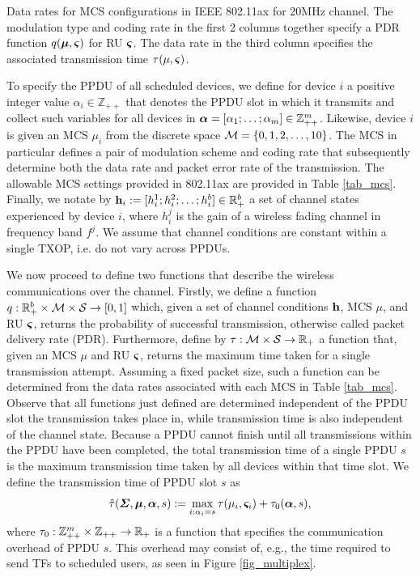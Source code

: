 \begin{table}

\caption{Data rates for MCS configurations in IEEE 802.11ax for 20MHz channel. The modulation type and coding rate in the first 2 columns together specify a PDR function $q(\boldsymbol{\mu},\boldsymbol{\varsigma})$ for RU $\boldsymbol{\varsigma}$. The data rate in the third column specifies the associated transmission time $\tau(\mu, \boldsymbol{\varsigma})$. }
\label{tab_mcs}
\end{table}

To specify the PPDU of all scheduled devices, we define for device $i$ a positive integer value $\alpha_i \in \mathbb{Z}_{++}$ that denotes the PPDU slot in which it transmits and collect such variables for all devices in $\boldsymbol{\alpha} = [\alpha_1; \hdots; \alpha_m] \in \mathbb{Z}_{++}^m$. Likewise, device $i$ is given an MCS $\mu_i$ from the discrete space ${\mathcal M} = \{0,1,2,\hdots,10\}$. The MCS in particular defines a pair of modulation scheme and coding rate that subsequently determine both the data rate and packet error rate of the transmission. The allowable MCS settings provided in 802.11ax are provided in Table \ref{tab_mcs}. Finally, we notate by ${\mathbf h}_{i} := [h_i^1; h_i^2; \hdots; h_i^b] \in {\mathbb R}^b_+$ a set of channel states experienced by device $i$, where $h_i^j$ is the gain of a wireless fading channel in frequency band $f^j$. We assume that channel conditions are constant within a single TXOP, i.e. do not vary across PPDUs.

We now proceed to define two functions that describe the wireless communications over the channel. Firstly, we define a function  $q: {\mathbb R}_+^b \times {\ensuremath{\mathcal M}} \times {\ensuremath{\mathcal S}} \rightarrow [0,1]$ which, given a set of channel conditions ${\mathbf h}$, MCS $\mu$, and RU $\boldsymbol{\varsigma}$, returns the probability of successful transmission, otherwise called packet delivery rate (PDR). Furthermore, define by $\tau: {\mathcal M} \times {\ensuremath{\mathcal S}}  \rightarrow {\mathbb R}_+$ a function that, given an MCS $\mu$ and RU $\boldsymbol{\varsigma}$, returns the maximum time taken for a single transmission attempt. Assuming a fixed packet size, such a function can be determined from the data rates associated with each MCS in Table \ref{tab_mcs}.  Observe that all functions just defined are determined independent of the PPDU slot the transmission takes place in, while transmission time is also independent of the channel state. Because a PPDU cannot finish until all transmissions within the PPDU have been completed, the total transmission time of a single PPDU $s$ is the maximum transmission time taken by all devices within that time slot. We define the transmission time of PPDU slot $s$ as
%
\begin{equation}\label{eq_time_slot}
\hat{\tau}(\bbSigma, \bbmu, \bbalpha, s) := \max_{i: \alpha_i = s} \tau(\mu_i, \bbsigma_i) + \tau_0(\bbalpha,s),
\end{equation}
%
where $\tau_0: \mathbb{Z}_{++}^m \times \mathbb{Z}_{++} \rightarrow {\mathbb R}_+$ is a function that specifies the communication overhead of PPDU $s$. This overhead may consist of, e.g., the time required to send TFs to scheduled users, as seen in Figure \ref{fig_multiplex}.

